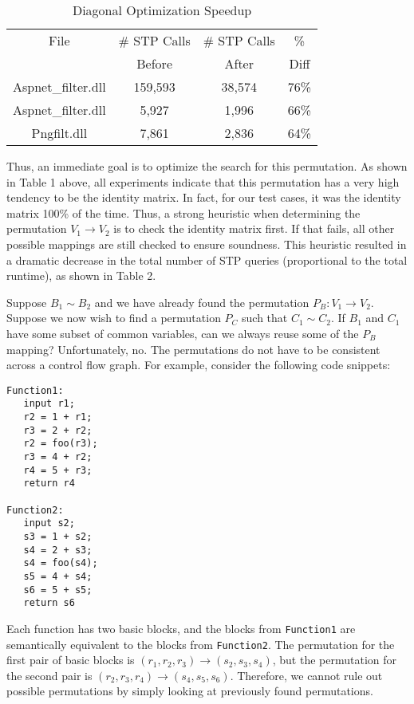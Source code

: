 \documentclass[11pt,twocolumn]{article}
\begin{document}
\begin{table}[t]
\caption{Diagonal Optimization Speedup}
\centering
\begin{tabular}{ c c c c }
\hline \hline
File & {\small  \# STP Calls} &  {\small \# STP Calls}  & \% \\
 & {\small Before} & {\small After } & Diff \\
\hline
{\small Aspnet\_filter.dll} & 159,593 & 38,574 & 76\%  \\
{\small Aspnet\_filter.dll}\footnotemark[1] & 5,927 & 1,996 & 66\%  \\
{\small Pngfilt.dll}\footnotemark[1] & 7,861 &  2,836  & 64\% \\
\end{tabular}
\end{table}




Thus, an immediate goal is to optimize the search for this permutation.
As shown in Table 1 above, all experiments indicate that this permutation has a very high tendency to be the identity matrix.  In fact, for our test cases, it was the identity matrix 100\% of the time.  Thus, a strong heuristic when determining the permutation $V_1 \rightarrow V_2$ is to check the identity matrix first.  If that fails, all other possible mappings are still checked to ensure soundness.  This heuristic resulted in a dramatic decrease in the total number of STP queries (proportional to the total runtime), as shown in Table 2.

Suppose $B_1 \sim B_2$ and we have already found the permutation $P_B : V_1 \rightarrow V_2$.  Suppose we now wish to find a permutation $P_C$ such that $C_1 \sim C_2$.  If $B_1$ and $C_1$ have some subset of common variables, can we always reuse some of the $P_B$ mapping?  Unfortunately, no.  The permutations do not have to be consistent across a control flow graph.
For example, consider the following code snippets:
\begin{verbatim}
Function1:
   input r1;
   r2 = 1 + r1;
   r3 = 2 + r2;
   r2 = foo(r3);
   r3 = 4 + r2;
   r4 = 5 + r3;
   return r4
   
Function2:
   input s2;
   s3 = 1 + s2;
   s4 = 2 + s3;
   s4 = foo(s4);
   s5 = 4 + s4;
   s6 = 5 + s5;
   return s6
\end{verbatim}

Each function has two basic blocks, and the blocks from \texttt{Function1} are semantically equivalent to the blocks from \texttt{Function2}.  The permutation for the first pair of basic blocks is $(r_1,r_2,r_3) \rightarrow (s_2,s_3,s_4)$, but the permutation for the second pair is $(r_2,r_3,r_4) \rightarrow (s_4,s_5,s_6)$.  Therefore, we cannot rule out possible permutations by simply looking at previously found permutations.  
\end{document}
